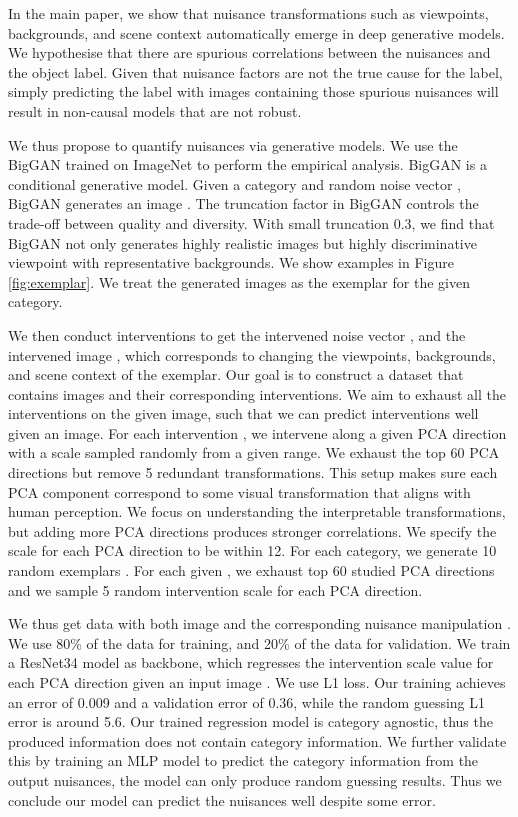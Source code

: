 \documentclass[final]{cvpr}
\begin{document}
\begin{subappendices}
In the main paper, we show that nuisance transformations such as viewpoints, backgrounds, and scene context automatically emerge in deep generative models. We hypothesise that there are spurious correlations between the nuisances and the object label. Given that nuisance factors are not the true cause for the label, simply predicting the label with images containing those spurious nuisances will result in non-causal models that are not robust.

We thus propose to quantify nuisances via generative models. We use the BigGAN \cite{BigGAN} \cite{BigGAN} trained on ImageNet to perform the empirical analysis. BigGAN is a conditional generative model. Given a category  and random noise vector , BigGAN generates an image . The truncation factor in BigGAN controls the trade-off between quality and diversity. With small truncation 0.3, we find that  BigGAN not only generates highly realistic images but highly discriminative viewpoint with representative backgrounds. We show examples in Figure \ref{fig:exemplar}. We treat the generated images as the exemplar for the given category.



We then conduct interventions  to get the intervened noise vector , and the intervened image , which corresponds to changing the viewpoints, backgrounds, and scene context of the exemplar. Our goal is to construct a dataset that contains images and their corresponding interventions. We aim to exhaust all the interventions  on the given image, such that we can predict interventions well given an image. For each intervention , we intervene along a given PCA direction with a scale sampled randomly from a given range. We exhaust the top 60 PCA directions but remove 5 redundant transformations. This setup makes sure each PCA component correspond to some visual transformation that aligns with human perception. We focus on understanding the interpretable transformations, but adding more PCA directions produces stronger correlations. We specify the scale for each PCA direction to be within 12. For each category, we generate 10 random exemplars . For each given , we exhaust top 60 studied PCA directions and we sample 5 random intervention scale for each PCA direction. 


We thus get data with both image  and the corresponding nuisance manipulation . We use 80\% of the data for training, and 20\% of the data for validation. We train a ResNet34 \cite{He_2016} model as backbone, which regresses the  intervention scale value for each PCA direction given an input image . We use L1 loss. Our training achieves an error of 0.009 and a validation error of 0.36, while the random guessing L1 error is around 5.6. Our trained regression model is category agnostic, thus the produced information does not contain category information. We further validate this by training an MLP model to predict the category information from the output nuisances, the model can only produce random guessing results. Thus we conclude our model can predict the nuisances well despite some error. 


\end{subappendices}
\end{document}
